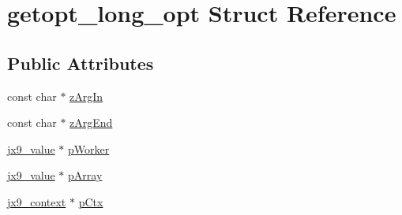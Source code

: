 \hypertarget{structgetopt__long__opt}{\section{getopt\-\_\-long\-\_\-opt Struct Reference}
\label{d0/d31/structgetopt__long__opt}
}
\subsection*{Public Attributes}
\begin{DoxyCompactItemize}
\item 
const char $\ast$ \hyperlink{structgetopt__long__opt_ae27fdfdee6eee6ea7d184572bfcf2713}{z\-Arg\-In}
\item 
const char $\ast$ \hyperlink{structgetopt__long__opt_a2fded382b0b101f0658094a2aa85fb43}{z\-Arg\-End}
\item 
\hyperlink{structjx9__value}{jx9\-\_\-value} $\ast$ \hyperlink{structgetopt__long__opt_a6b43c3243f7b5aa6967f767a6b28d0b8}{p\-Worker}
\item 
\hyperlink{structjx9__value}{jx9\-\_\-value} $\ast$ \hyperlink{structgetopt__long__opt_a97fd021967097a3d8a7fc0b47558daf6}{p\-Array}
\item 
\hyperlink{structjx9__context}{jx9\-\_\-context} $\ast$ \hyperlink{structgetopt__long__opt_afe6c313e65908b6f7de9dfc1ad802405}{p\-Ctx}
\end{DoxyCompactItemize}


